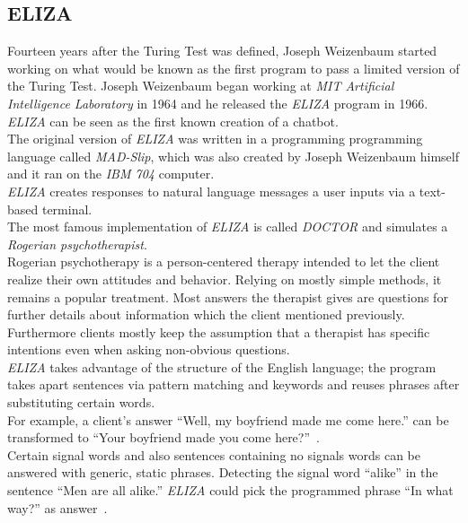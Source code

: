 \subsection{ELIZA}
\label{eliza}

Fourteen years after the Turing Test was defined, Joseph Weizenbaum started working on what would be known as the first program to pass a limited version of the Turing Test.
Joseph Weizenbaum began working at \emph{MIT Artificial Intelligence Laboratory} in 1964 and he released the \emph{ELIZA} program in 1966.
\\
\emph{ELIZA} can be seen as the first known creation of a chatbot.
\\

The original version of \emph{ELIZA} was written in a programming programming language called \emph{MAD-Slip},
which was also created by Joseph Weizenbaum himself and it ran on the \emph{IBM 704} computer.
\\
\emph{ELIZA} creates responses to natural language messages a user inputs via a text-based terminal.
\\

The most famous implementation of \emph{ELIZA} is called \emph{DOCTOR} and simulates a \emph{Rogerian psychotherapist}.
\\
Rogerian psychotherapy is a person-centered therapy intended to let the client realize their own attitudes and behavior.
Relying on mostly simple methods, it remains a popular treatment.
Most answers the therapist gives are questions for further details about information which the client mentioned previously.
Furthermore clients mostly keep the assumption that a therapist has specific intentions even when asking non-obvious questions.
\\

\emph{ELIZA} takes advantage of the structure of the English language;
the program takes apart sentences via pattern matching and keywords and reuses phrases after substituting certain words.
\\
For example, a client's answer ``Well, my boyfriend made me come here.'' can be transformed to ``Your boyfriend made you come here?''~\cite{elizatest}.
\\
Certain signal words and also sentences containing no signals words can be answered with generic, static phrases.
Detecting the signal word ``alike'' in the sentence ``Men are all alike.'' \emph{ELIZA} could pick the programmed phrase ``In what way?'' as answer~\cite{elizatest}.
\\

